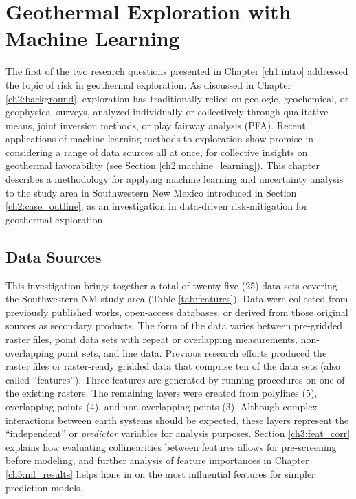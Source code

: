 \chapter{Geothermal Exploration with Machine Learning}\label{ch3:expl_ml_prep}

The first of the two research questions presented in Chapter \ref{ch1:intro} addressed the topic of risk in geothermal exploration. As discussed in Chapter \ref{ch2:background}, exploration has traditionally relied on geologic, geochemical, or geophysical surveys, analyzed individually or collectively through qualitative means, joint inversion methods, or play fairway analysis (PFA). Recent applications of machine-learning methods to exploration show promise in considering a range of data sources all at once, for collective insights on geothermal favorability (see Section \ref{ch2:machine_learning}). This chapter describes a methodology for applying machine learning and uncertainty analysis to the study area in Southwestern New Mexico introduced in Section \ref{ch2:case_outline}, as an investigation in data-driven risk-mitigation for geothermal exploration.

\section{Data Sources}\label{ch3:expl_data_src}

This investigation brings together a total of twenty-five (25) data sets covering the Southwestern NM study area (Table \ref{tab:features}). Data were collected from previously published works, open-access databases, or derived from those original sources as secondary products. The form of the data varies between pre-gridded raster files, point data sets with repeat or overlapping measurements, non-overlapping point sets, and line data. Previous research efforts produced the raster files or raster-ready gridded data that comprise ten of the data sets (also called ``features”). Three features are generated by running procedures on one of the existing rasters. The remaining layers were created from polylines (5), overlapping points (4), and non-overlapping points (3). Although complex interactions between earth systems should be expected, these layers represent the ``independent'' or \textit{predictor} variables for analysis purposes. Section \ref{ch3:feat_corr} explains how evaluating collinearities between features allows for pre-screening before modeling, and further analysis of feature importances in Chapter \ref{ch5:ml_results} helps hone in on the most influential features for simpler prediction models.

